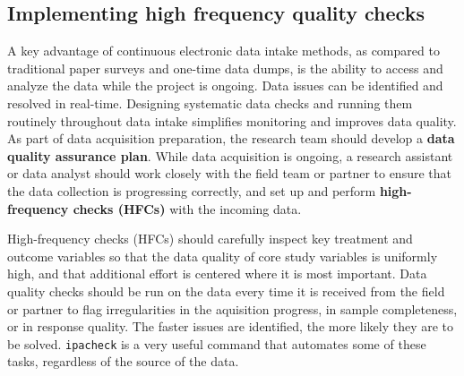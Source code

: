 \subsection{Implementing high frequency quality checks}

A key advantage of continuous electronic data intake methods,
as compared to traditional paper surveys and one-time data dumps,
is the ability to access and analyze the data while the project is ongoing.
Data issues can be identified and resolved in real-time.
Designing systematic data checks and running them routinely throughout data intake
simplifies monitoring and improves data quality.
As part of data acquisition preparation,
the research team should develop a \textbf{data quality assurance plan}.
While data acquisition is ongoing,
a research assistant or data analyst should work closely with the field team or partner
to ensure that the data collection is progressing correctly,
and set up and perform \textbf{high-frequency checks (HFCs)} with the incoming data.

High-frequency checks (HFCs) should carefully inspect key treatment and outcome variables
so that the data quality of core study variables is uniformly high,
and that additional effort is centered where it is most important.
Data quality checks should be run on the data every time it is received from the field or partner
to flag irregularities in the aquisition progress, in sample completeness, or in response quality.
The faster issues are identified, the more likely they are to be solved.
\texttt{ipacheck}
is a very useful command that automates some of these tasks,
regardless of the source of the data.

